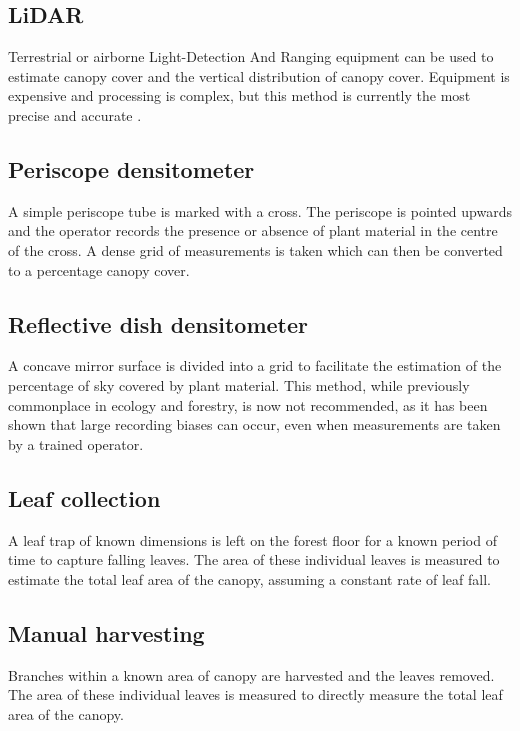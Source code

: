 \documentclass{article}
\begin{document}
\subsection{LiDAR}

Terrestrial or airborne Light-Detection And Ranging equipment can be used to estimate canopy cover and the vertical distribution of canopy cover. Equipment is expensive and processing is complex, but this method is currently the most precise and accurate \citep{Seidel2011}.

\subsection{Periscope densitometer}

A simple periscope tube is marked with a cross. The periscope is pointed upwards and the operator records the presence or absence of plant material in the centre of the cross. A dense grid of measurements is taken which can then be converted to a percentage canopy cover.

\subsection{Reflective dish densitometer}

A concave mirror surface is divided into a grid to facilitate the estimation of the percentage of sky covered by plant material. This method, while previously commonplace in ecology and forestry, is now not recommended, as it has been shown that large recording biases can occur, even when measurements are taken by a trained operator.

\subsection{Leaf collection}

A leaf trap of known dimensions is left on the forest floor for a known period of time to capture falling leaves. The area of these individual leaves is measured to estimate the total leaf area of the canopy, assuming a constant rate of leaf fall.

\subsection{Manual harvesting}

Branches within a known area of canopy are harvested and the leaves removed. The area of these individual leaves is measured to directly measure the total leaf area of the canopy.


\printbibliography
\end{document}
